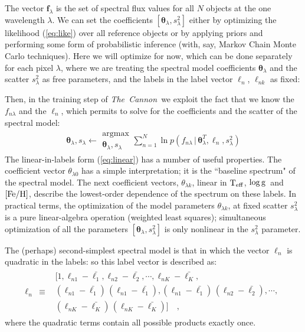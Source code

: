 \documentclass[12pt, preprint]{aastex}
\newcommand{\tc}{\textsl{The~Cannon}}
\newcommand{\set}[1]{\bm{#1}}
\newcommand{\starlabel}{\ell}
\newcommand{\starlabelvec}{\set{\starlabel}}
\newcommand{\given}{\,|\,}
\newcommand{\teff}{\mbox{$\rm T_{eff}$}}
\newcommand{\feh}{\mbox{$\rm [Fe/H]$}}
\newcommand{\logg}{\mbox{$\rm \log g$}}
\begin{document}
The vector $\set{f}_\lambda$ is the set of spectral flux values for
all $N$ objects at the one wavelength $\lambda$.
We can set the coefficients $[\set{\theta}_\lambda,s_\lambda^2]$ either by
optimizing the likelihood (\ref{eq:like}) over all reference objects or by applying priors and
performing some form of probabilistic inference (with, say, Markov
Chain Monte Carlo techniques).
Here we will optimize for now, which can be done separately for each pixel $\lambda$, where
we are treating the spectral model coefficients $\set{\theta}_\lambda$ and the scatter $s_\lambda^2$ as free parameters, and the
labels in the label vector $\starlabelvec_n$, $\starlabel_{nk}$ as fixed:

Then, in the training step of \tc\ we exploit the fact that we know the $f_{n\lambda}$
and the $\starlabelvec_n$, which permits to solve for the coefficients and the scatter of the spectral model:
\begin{eqnarray}
\set{\theta}_\lambda,s_\lambda \leftarrow \substack{\mbox{argmax}\\{\set{\theta}_\lambda}, s_\lambda}
\sum_{n=1}^N \ln p(f_{n\lambda}\given\set{\theta}^T_\lambda, \starlabelvec_n, s_\lambda^2)
\label{eq:trainingstep}
\end{eqnarray}
The linear-in-labels form (\ref{eq:linear}) has a number of useful properties.
The coefficient vector $\theta_{\lambda 0}$ has a simple interpretation;
it is the ``baseline spectrum" of the spectral model. 
The next coefficient vectors,  $\theta_{\lambda k}$, linear in \teff , \logg ~and \feh,
describe the lowest-order dependence of the spectrum on these labels.
In practical terms, the optimization of the model parameters $\theta_{\lambda k}$, at fixed scatter
$s_\lambda^2$ is a pure linear-algebra operation (weighted least
squares); simultaneous optimization of all the parameters
$[\set{\theta}_\lambda,s_\lambda^2]$ is only nonlinear in the $s_\lambda^2$
parameter.

The (perhaps) second-simplest spectral model is that in which the
vector $\starlabelvec_n$ is quadratic in the labels: so this label vector is described as:
\begin{eqnarray}
\starlabelvec_n &\equiv& \begin{array}{l}[1,
                          \starlabel_{n1} - \bar{\starlabel_1},
                          \starlabel_{n2} - \bar{\starlabel_2},
                          \cdots,
                          \starlabel_{nK} - \bar{\starlabel_K},\\
                          (\starlabel_{n1} - \bar{\starlabel_1})\,(\starlabel_{n1} - \bar{\starlabel_1}),
                          (\starlabel_{n1} - \bar{\starlabel_1})\,(\starlabel_{n2} - \bar{\starlabel_2}),
                          \cdots,\\
                          (\starlabel_{nK} - \bar{\starlabel_K})\,(\starlabel_{nK} - \bar{\starlabel_K})]\quad ,
\end{array}
\label{eq:quadinlabels}
\end{eqnarray}
where the quadratic terms contain all possible products exactly once.
\end{document}
